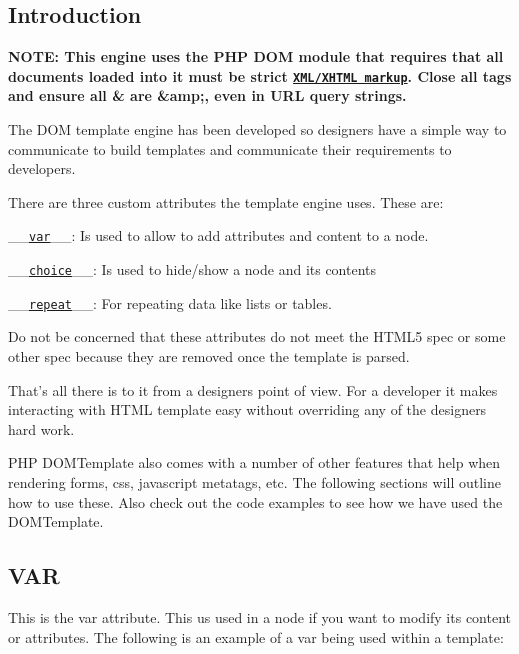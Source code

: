 \subsection*{Introduction}

{\bfseries N\+O\+T\+E\+: This engine uses the P\+H\+P D\+O\+M module that requires that all documents loaded into it must be strict \href{https://en.wikipedia.org/wiki/XHTML}{\tt X\+M\+L/\+X\+H\+T\+M\+L markup}. Close all tags and ensure all \& are \&amp;, even in U\+R\+L query strings.}

The D\+O\+M template engine has been developed so designers have a simple way to communicate to build templates and communicate their requirements to developers.

There are three custom attributes the template engine uses. These are\+:


\begin{DoxyEnumerate}
\item \+\_\+\+\_\+\href{#var}{\tt var}\+\_\+\+\_\+\+: Is used to allow to add attributes and content to a node.
\item \+\_\+\+\_\+\href{#choice}{\tt choice}\+\_\+\+\_\+\+: Is used to hide/show a node and its contents
\item \+\_\+\+\_\+\href{#repeat}{\tt repeat}\+\_\+\+\_\+\+: For repeating data like lists or tables.
\end{DoxyEnumerate}

Do not be concerned that these attributes do not meet the H\+T\+M\+L5 spec or some other spec because they are removed once the template is parsed.

That's all there is to it from a designers point of view. For a developer it makes interacting with H\+T\+M\+L template easy without overriding any of the designers hard work.

P\+H\+P D\+O\+M\+Template also comes with a number of other features that help when rendering forms, css, javascript metatags, etc. The following sections will outline how to use these. Also check out the code examples to see how we have used the D\+O\+M\+Template.

\subsection*{V\+A\+R}

This is the {\ttfamily var} attribute. This us used in a node if you want to modify its content or attributes. The following is an example of a {\ttfamily var} being used within a template\+:

